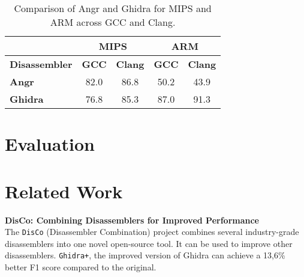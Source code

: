 \documentclass[seminar]{plai}
\begin{document}
\begin{table}[H]
\centering
\begin{tabular}{|l|c|c||c|c|}
\hline
 & \multicolumn{2}{c||}{\textbf{MIPS}} & \multicolumn{2}{c|}{\textbf{ARM}} \\
\hline
\textbf{Disassembler} & \textbf{GCC} & \textbf{Clang} & \textbf{GCC} & \textbf{Clang} \\
\hline
\textbf{Angr}   & 82.0 & 86.8 & 50.2 & 43.9 \\
\hline
\textbf{Ghidra} & 76.8 & 85.3 & 87.0 & 91.3 \\
\hline
\end{tabular}
\caption{Comparison of Angr and Ghidra for MIPS and ARM across GCC and Clang.}
\end{table}

\begin{table}[H]
\centering
{}
\caption{Comparison of Angr and Ghidra on Instruction Boundary and Function Boundary metrics.\cite{an-empirical-study-on-ARM-disassembly-disassembly-tools}}
\end{table}




\section{Evaluation}
\label{sec:evaluation}

\section{Related Work}
\label{sec:related-work}
\textbf{DisCo: Combining Disassemblers for Improved Performance}\\
The \texttt{DisCo} (Disassembler Combination) project combines several industry-grade disassemblers into one novel open-source tool. It can be used to improve other disassemblers. \texttt{Ghidra+}, the improved version of Ghidra can achieve a 13,6\% better F1 score compared to the original.\cite{DisCo-combining-disassemblers-for-improved-performance}\\
\end{document}
